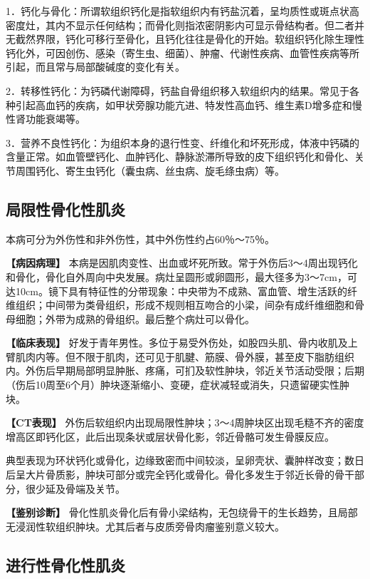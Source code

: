 1．钙化与骨化：所谓软组织钙化是指软组织内有钙盐沉着，呈均质性或斑点状高密度灶，其内不显示任何结构；而骨化则指浓密阴影内可显示骨结构者。但二者并无截然界限，钙化可移行至骨化，且钙化往往是骨化的开始。软组织钙化除生理性钙化外，可因创伤、感染（寄生虫、细菌）、肿瘤、代谢性疾病、血管性疾病等所引起，而且常与局部酸碱度的变化有关。

2．转移性钙化：为钙磷代谢障碍，钙盐自骨组织移入软组织内的结果。常见于各种引起高血钙的疾病，如甲状旁腺功能亢进、特发性高血钙、维生素D增多症和慢性肾功能衰竭等。

3．营养不良性钙化：为组织本身的退行性变、纤维化和坏死形成，体液中钙磷的含量正常。如血管壁钙化、血肿钙化、静脉淤滞所导致的皮下组织钙化和骨化、关节周围钙化、寄生虫钙化（囊虫病、丝虫病、旋毛绦虫病）等。

\subsection{局限性骨化性肌炎}

本病可分为外伤性和非外伤性，其中外伤性约占60％～75％。

\textbf{【病因病理】}
本病是因肌肉变性、出血或坏死所致。常于外伤后3～4周出现钙化和骨化，骨化自外周向中央发展。病灶呈圆形或卵圆形，最大径多为3～7cm，可达10cm。镜下具有特征性的分带现象：中央带为不成熟、富血管、增生活跃的纤维组织；中间带为类骨组织，形成不规则相互吻合的小梁，间杂有成纤维细胞和骨母细胞；外带为成熟的骨组织。最后整个病灶可以骨化。

\textbf{【临床表现】}
好发于青年男性。多位于易受外伤处，如股四头肌、骨内收肌及上臂肌肉内等。但不限于肌肉，还可见于肌腱、筋膜、骨外膜，甚至皮下脂肪组织内。外伤后早期局部明显肿胀、疼痛，可扪及软性肿块，邻近关节活动受限；后期（伤后10周至6个月）肿块逐渐缩小、变硬，症状减轻或消失，只遗留硬实性肿块。

\textbf{【CT表现】}
外伤后软组织内出现局限性肿块；3～4周肿块区出现毛糙不齐的密度增高区即钙化区，此后出现条状或层状骨化影，邻近骨骼可发生骨膜反应。

典型表现为环状钙化或骨化，边缘致密而中间较淡，呈卵壳状、囊肿样改变；数日后呈大片骨质影，肿块可部分或完全钙化或骨化。骨化多发生于邻近长骨的骨干部分，很少延及骨端及关节。

\textbf{【鉴别诊断】}
骨化性肌炎骨化后有骨小梁结构，无包绕骨干的生长趋势，且局部无浸润性软组织肿块。尤其后者与皮质旁骨肉瘤鉴别意义较大。

\subsection{进行性骨化性肌炎}

